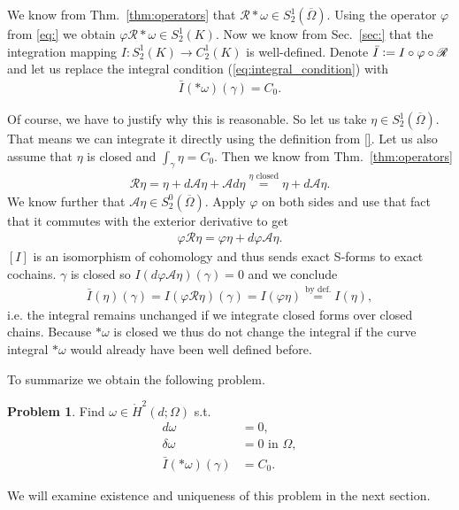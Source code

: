 \documentclass[12pt,a4paper]{article}
\numberwithin{equation}{subsection}
\numberwithin{lemma}{subsection}
\theoremstyle{definition}
\newtheorem{problem}[lemma]{Problem}
\newcommand{\aop}{\mathscr{A}}
\newcommand{\omegabar}{\overline{\Omega}}
\newcommand{\rop}{\mathscr{R}} %
\begin{document}
We know from Thm.~\ref{thm:operators} that $\rop *\omega \in S^1_2(\omegabar)$.
Using the operator $\varphi$ from \ref{eq:} we obtain 
$\varphi \rop *\omega \in S^1_2(K)$. Now we know from Sec.~\ref{sec:} that 
the integration mapping $I: S^1_2(K) \rightarrow C^1_2(K)$ is well-defined.
Denote $\bar{I} \vcentcolon= I\circ \varphi \circ \rop$ and 
let us replace the integral condition (\ref{eq:integral_condition}) with 
\begin{align*}
    \bar{I}(*\omega)(\gamma) = C_0.
\end{align*}

Of course, we have to justify why this is reasonable. 
So let us take $\eta \in S^1_2(\omegabar)$. That means we can integrate it 
directly using the definition from \ref{}. 
Let us also assume that $\eta$ is closed and 
$\int_\gamma \eta = C_0$. %
Then we know from Thm.~\ref{thm:operators}
\begin{align*}
    \rop \eta = \eta + d\aop \eta + \aop d\eta 
    \stackrel{\eta \text{ closed}}{=} \eta + d\aop \eta.
\end{align*}
We know further that $\aop \eta \in S^0_2(\omegabar)$. 
Apply $\varphi$ on both sides and use that fact that it commutes with the 
exterior derivative to get
\begin{align*}
    \varphi \rop \eta = \varphi\eta + d \varphi\aop \eta.
\end{align*}
$[I]$ is an isomorphism of cohomology and thus sends exact S-forms to exact 
cochains. $\gamma$ is closed so $I(d \varphi\aop \eta)(\gamma) = 0$ and 
we conclude 
\begin{align*}
    \bar{I}(\eta)(\gamma) = I(\varphi \rop \eta)(\gamma) = I(\varphi \eta)
    \stackrel{\text{by def.}}{=} I(\eta),
\end{align*}
i.e. the integral remains unchanged if we integrate closed forms over 
closed chains. Because $*\omega$ is closed we thus do not change the integral 
if the curve integral $*\omega$ would already have been well defined before.

To summarize we obtain the following problem.
\begin{problem}
    Find $\omega \in \mathring{H}^2(d;\Omega)$ s.t.
    \begin{align*}
        d \omega &= 0, \\
        \delta \omega &= 0 \text{ in $\Omega$}, \\
        \bar{I}(*\omega)(\gamma)  &= C_0.
    \end{align*}
\end{problem}
\noindent We will examine existence and 
uniqueness of this problem in the next section.
\end{document}

